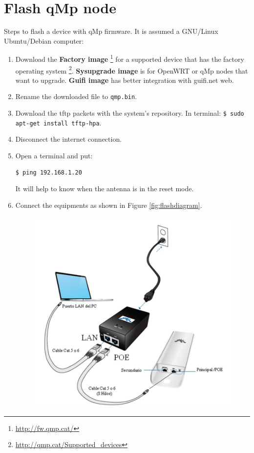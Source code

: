 \documentclass[11pt]{article}
\begin{document}
\section{Flash qMp node}
\label{sec-4}
Steps to flash a device with qMp firmware. It is assumed a GNU/Linux
Ubuntu/Debian computer:
\begin{enumerate}
\item Download the \textbf{Factory image} \footnote{\url{http://fw.qmp.cat/}} for a supported device that
has the factory operating system \footnote{\url{http://qmp.cat/Supported_devices}}. \textbf{Sysupgrade image} is for
OpenWRT or qMp nodes that want to upgrade. \textbf{Guifi image} has better
integration with guifi.net web.
\item Rename the downloaded file to \texttt{qmp.bin}.
\item Download the tftp packets with the system's repository. In
terminal: \texttt{\$ sudo apt-get install tftp-hpa}.
\item Disconnect the internet connection.
\item Open a terminal and put:
\begin{verbatim}
$ ping 192.168.1.20
\end{verbatim}
It will help to know when the antenna is in the reset mode.
\item Connect the equipments as shown in Figure \ref{fig:flashdiagram}.
\begin{figure}[htb]
\centering
\includegraphics[width=.9\linewidth]{./img/general/flashdiagram.jpg}

\end{figure}
\end{enumerate}
\end{document}
